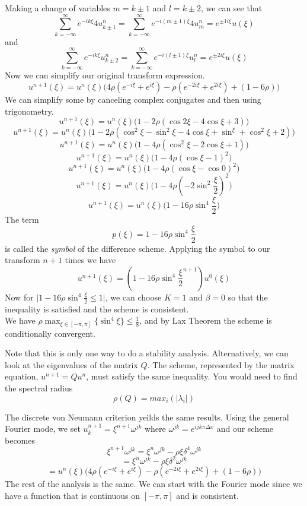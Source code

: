 \documentclass[12pt]{article}
\theoremstyle{definition}
\begin{document}
\begin{enumerate}
\begin{enumerate}[(i)]
Making a change of variables $m=k\pm1$ and $l=k\pm2$, we can see that
\[\displaystyle\sum_{k=-\infty}^{\infty}e^{-ik\xi} 4u_{k\pm 1}^n=\sum_{k=-\infty}^{\infty}e^{-i(m\pm1)\xi} 4u_{m}^n=e^{\pm1i\xi}u(\xi)\]
and 
\[\displaystyle\sum_{k=-\infty}^{\infty}e^{-ik\xi} u_{k\pm 2}^n=\sum_{k=-\infty}^{\infty}e^{-i(l\pm1)\xi} u_{l}^n=e^{\pm2i\xi}u(\xi)\]
Now we can simplify our original transform expression.
\[u^{n+1}(\xi)=u^n(\xi)\big ( 4\rho(e^{-i\xi}+e^{i\xi})-\rho(e^{-2i\xi}+e^{2i\xi})+(1-6\rho)\big )\]
We can simplify some by canceling complex conjugates and then using trigonometry.
\[u^{n+1}(\xi)=u^n(\xi)\big ( 1 -2\rho(\cos{2\xi}-4\cos{\xi}+3)\big )\]
\[u^{n+1}(\xi)=u^n(\xi)\big ( 1 -2\rho(\cos^2{\xi}-\sin^2{\xi}-4\cos{\xi}+\sin^{\xi} +\cos^2{\xi}+2)\big )\]
\[u^{n+1}(\xi)=u^n(\xi)\big ( 1 -4\rho(\cos^2{\xi}-2\cos{\xi}+1)\big )\]
\[u^{n+1}(\xi)=u^n(\xi)\big ( 1 -4\rho(\cos{\xi}-1)^2\big )\]
\[u^{n+1}(\xi)=u^n(\xi)\big ( 1 -4\rho(\cos{\xi}-\cos{0})^2\big )\]
\[u^{n+1}(\xi)=u^n(\xi)\big ( 1 -4\rho(-2\sin^2{\frac{\xi}{2}})^2\big )\]
\[u^{n+1}(\xi)=u^n(\xi)\big ( 1 -16\rho\sin^4{\frac{\xi}{2}}\big )\]
The term \[p(\xi)=1-16\rho\sin^4{\frac{\xi}{2}}\]
is called the \emph{symbol} of the difference scheme. Applying the symbol to our transform $n+1$ times we have
\[u^{n+1}(\xi)=(1-16\rho\sin^4{\frac{\xi}{2}}^{n+1})u^0(\xi)\]
Now for $\vert 1-16\rho\sin^4{\frac{\xi}{2}}\leq 1\vert$, we can choose $K=1$ and $\beta=0$ so that the inequality is satisfied and the scheme is consistent.\\
We have $\rho\max_{\xi\in[-\pi,\pi]}\{\sin^4{\xi}\}\leq\frac{1}{8}$, and by Lax Theorem the scheme is conditionally convergent.

Note that this is only one way to do a stability analysis. Alternatively, we can look at the eigenvalues of the matrix $Q$. The scheme, represented by the matrix equation, $u^{n+1}=Qu^n$, must satisfy the same inequality. You would need to find the spectral radius 
\[ \rho(Q) = max_i(\vert \lambda_i\vert)\] 

The discrete von Neumann criterion yeilds the same results. Using the general Fourier mode, we set $u_k^{n+1}=\xi^{n+1}\omega^{jk}$ where $\omega^{jk}=e^{ijk\pi\Delta x}$ and our scheme becomes
\[\xi^{n+1}\omega^{jk} =\xi^n\omega^{jk}-\rho\xi\delta^4\omega^{jk}\]
\[=\xi^n\omega^{jk}-\rho\xi\delta^2\omega^{jk}\]
\[=u^n(\xi)\big ( 4\rho(e^{-i\xi}+e^{i\xi})-\rho(e^{-2i\xi}+e^{2i\xi})+(1-6\rho)\big )\]
The rest of the analysis is the same. We can start with the Fourier mode since we have a function that is continuous on $[-\pi,\pi]$ and is consistent.


\end{enumerate}
\end{enumerate}
\end{document}
